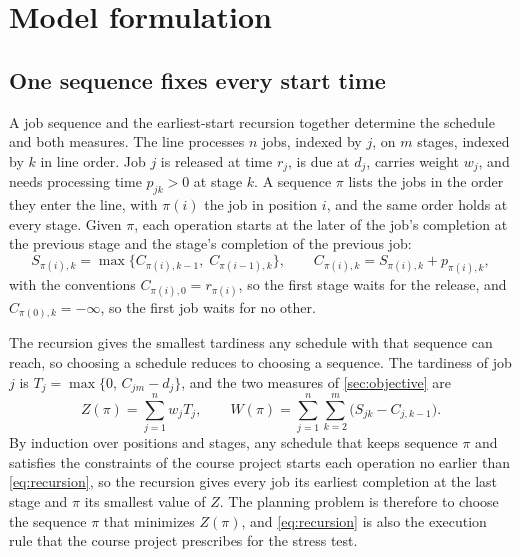 \section{Model formulation}\label{sec:formulation}

\subsection{One sequence fixes every start time}\label{sec:timing}

\sumpara A job sequence and the earliest-start recursion together determine the schedule and both measures. \sumparaend
\fin The line processes $n$ jobs, indexed by $j$, on $m$ stages, indexed by $k$ in line order. \fine
\fin Job $j$ is released at time $r_j$, is due at $d_j$, carries weight $w_j$, and needs processing time $p_{jk} > 0$ at stage $k$. \fine
\fin A sequence $\pi$ lists the jobs in the order they enter the line, with $\pi(i)$ the job in position $i$, and the same order holds at every stage. \fine
\fin Given $\pi$, each operation starts at the later of the job's completion at the previous stage and the stage's completion of the previous job: \fine
\begin{equation}\label{eq:recursion}
S_{\pi(i),k} = \max\bigl\{C_{\pi(i),k-1},\; C_{\pi(i-1),k}\bigr\}, \qquad C_{\pi(i),k} = S_{\pi(i),k} + p_{\pi(i),k},
\end{equation}
\fin with the conventions $C_{\pi(i),0} = r_{\pi(i)}$, so the first stage waits for the release, and $C_{\pi(0),k} = -\infty$, so the first job waits for no other. \fine

\sumpara The recursion gives the smallest tardiness any schedule with that sequence can reach, so choosing a schedule reduces to choosing a sequence. \sumparaend
\fin The tardiness of job $j$ is $T_j = \max\{0,\, C_{jm} - d_j\}$, and the two measures of \cref{sec:objective} are \fine
\begin{equation}\label{eq:measures}
Z(\pi) = \sum_{j=1}^{n} w_j T_j, \qquad W(\pi) = \sum_{j=1}^{n} \sum_{k=2}^{m} \bigl(S_{jk} - C_{j,k-1}\bigr).
\end{equation}
\fin By induction over positions and stages, any schedule that keeps sequence $\pi$ and satisfies the constraints of the course project starts each operation no earlier than \eqref{eq:recursion}, so the recursion gives every job its earliest completion at the last stage and $\pi$ its smallest value of $Z$. \fine
\fin The planning problem is therefore to choose the sequence $\pi$ that minimizes $Z(\pi)$, and \eqref{eq:recursion} is also the execution rule that the course project prescribes for the stress test. \fine

